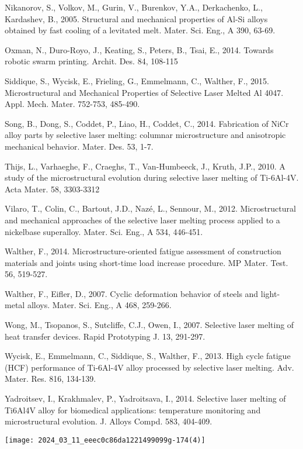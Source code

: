 \documentclass[10pt]{article}
\begin{document}
Nikanorov, S., Volkov, M., Gurin, V., Burenkov, Y.A., Derkachenko, L., Kardashev, B., 2005. Structural and mechanical properties of Al-Si alloys obtained by fast cooling of a levitated melt. Mater. Sci. Eng., A 390, 63-69.

Oxman, N., Duro-Royo, J., Keating, S., Peters, B., Tsai, E., 2014. Towards robotic swarm printing. Archit. Des. 84, 108-115

Siddique, S., Wycisk, E., Frieling, G., Emmelmann, C., Walther, F., 2015. Microstructural and Mechanical Properties of Selective Laser Melted Al 4047. Appl. Mech. Mater. 752-753, 485-490.

Song, B., Dong, S., Coddet, P., Liao, H., Coddet, C., 2014. Fabrication of NiCr alloy parts by selective laser melting: columnar microstructure and anisotropic mechanical behavior. Mater. Des. 53, 1-7.

Thijs, L., Varhaeghe, F., Craeghs, T., Van-Humbeeck, J., Kruth, J.P., 2010. A study of the microstructural evolution during selective laser melting of Ti-6Al-4V. Acta Mater. 58, 3303-3312

Vilaro, T., Colin, C., Bartout, J.D., Nazé, L., Sennour, M., 2012. Microstructural and mechanical approaches of the selective laser melting process applied to a nickelbase superalloy. Mater. Sci. Eng., A 534, 446-451.

Walther, F., 2014. Microstructure-oriented fatigue assessment of construction materials and joints using short-time load increase procedure. MP Mater. Test. 56, 519-527.

Walther, F., Eifler, D., 2007. Cyclic deformation behavior of steels and light-metal alloys. Mater. Sci. Eng., A 468, 259-266.

Wong, M., Tsopanos, S., Sutcliffe, C.J., Owen, I., 2007. Selective laser melting of heat transfer devices. Rapid Prototyping J. 13, 291-297.

Wycisk, E., Emmelmann, C., Siddique, S., Walther, F., 2013. High cycle fatigue (HCF) performance of Ti-6Al-4V alloy processed by selective laser melting. Adv. Mater. Res. 816, 134-139.

Yadroitsev, I., Krakhmalev, P., Yadroitsava, I., 2014. Selective laser melting of Ti6Al4V alloy for biomedical applications: temperature monitoring and microstructural evolution. J. Alloys Compd. 583, 404-409.

\begin{center}
\texttt{[image: 2024\_03\_11\_eeec0c86da1221499099g-174(4)]}
\end{center}
\end{document}
